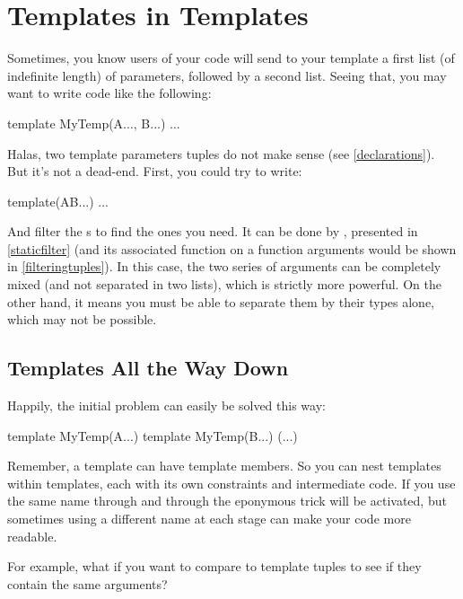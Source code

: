 
\section{Templates in Templates}\label{templatesintemplates}

Sometimes, you know users of your code will send to your template a first list (of indefinite length) of parameters, followed by a second list. Seeing that, you may want to write code like the following:

\begin{dcode}
template MyTemp(A..., B...)
{ ... }
\end{dcode}

Halas, two template parameters tuples do not make sense (see \autoref{declarations}). But it's not a dead-end. First, you could try to write:

\begin{dcode}
template(AB...)
{ ... }
\end{dcode}

And filter the s to find the ones you need. It can be done by , presented in \ref{staticfilter} (and its associated function on a function arguments would be  shown in \ref{filteringtuples}). In this case, the two series of arguments can be completely mixed (and not separated in two lists), which is strictly more powerful. On the other hand, it means you must be able to separate them by their types alone, which may not be possible.

\subsection{Templates All the Way Down}

Happily, the initial problem can easily be solved this way:

\begin{dcode}
template MyTemp(A...)
{
    template MyTemp(B...)
    {
    (...)
    }
}
\end{dcode}

Remember, a template can have template members. So you can nest templates within templates, each with its own constraints and intermediate code. If you use the same name through and through the eponymous trick will be activated, but sometimes using a different name at each stage can make your code more readable.

For example, what if you want to compare to template tuples to see if they contain the same arguments?

